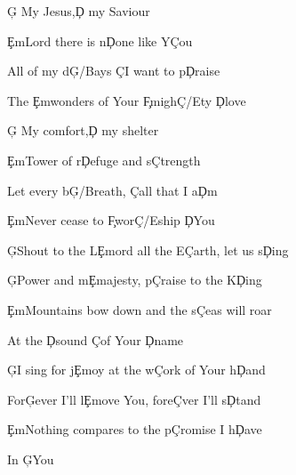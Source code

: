 \documentclass[9pt]{extarticle}
\begin{document}
\bsong

\bv
\c{G} My Jesus,\c{D} my Saviour

\c{Em}Lord there is n\c{D}one like Y\c{C}ou

All of my d\c{G/B}ays \c{C}I want to p\c{D}raise

The \c{Em}wonders of Your \c{F}migh\c{C/E}ty \c{D}love
\ev

\bv
\c{G} My comfort,\c{D} my shelter

\c{Em}Tower of r\c{D}efuge and s\c{C}trength

Let every b\c{G/B}reath, \c{C}all that I a\c{D}m

\c{Em}Never cease to \c{F}wor\c{C/E}ship \c{D}You
\ev

\bc
\c{G}Shout to the L\c{Em}ord all the E\c{C}arth, let us s\c{D}ing

\c{G}Power and m\c{Em}ajesty, p\c{C}raise to the K\c{D}ing

\c{Em}Mountains bow down and the s\c{C}eas will roar

At the \c{D}sound \c{C}of Your \c{D}name

\c{G}I sing for j\c{Em}oy at the w\c{C}ork of Your h\c{D}and

For\c{G}ever I'll l\c{Em}ove You, fore\c{C}ver I'll s\c{D}tand

\c{Em}Nothing compares to the p\c{C}romise I h\c{D}ave

In \c{G}You
\ec




\esong
\end{document}
